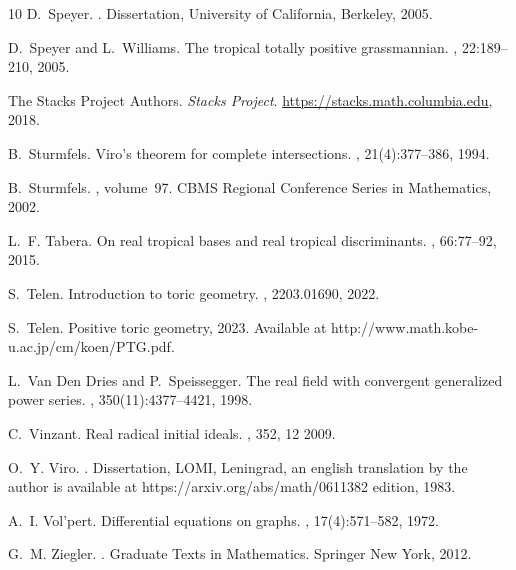 \documentclass{article}
\theoremstyle{definition}
\begin{document}
{\begin{thebibliography}{10}
D.~Speyer.
.
\newblock Dissertation, University of California, Berkeley, 2005.

D.~Speyer and L.~Williams.
\newblock The tropical totally positive grassmannian.
, 22:189--210, 2005.

The {Stacks Project Authors}.
\newblock \textit{Stacks Project}.
\newblock \url{https://stacks.math.columbia.edu}, 2018.

B.~Sturmfels.
\newblock Viro's theorem for complete intersections.
, 21(4):377--386, 1994.

B.~Sturmfels.
, volume~97.
\newblock CBMS Regional Conference Series in Mathematics, 2002.

L.~F. Tabera.
\newblock On real tropical bases and real tropical discriminants.
, 66:77–92, 2015.

S.~Telen.
\newblock Introduction to toric geometry.
, 2203.01690, 2022.

S.~Telen.
\newblock Positive toric geometry, 2023.
\newblock Available at http://www.math.kobe-u.ac.jp/cm/koen/PTG.pdf.

L.~{Van Den Dries} and P.~Speissegger.
\newblock The real field with convergent generalized power series.
, 350(11):4377--4421, 1998.

C.~Vinzant.
\newblock Real radical initial ideals.
, 352, 12 2009.

O.~Y. Viro.
.
\newblock Dissertation, LOMI, Leningrad, an english translation by the author is available at https://arxiv.org/abs/math/0611382 edition, 1983.

A.~I. Vol'pert.
\newblock Differential equations on graphs.
, 17(4):571–582, 1972.

G.~M. Ziegler.
.
\newblock Graduate Texts in Mathematics. Springer New York, 2012.

\end{thebibliography}


}
\end{document}
